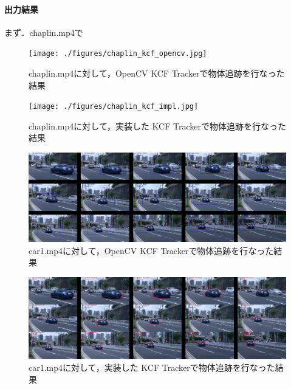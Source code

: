 \documentclass[11pt,a4j]{jarticle}
\begin{document}
    \paragraph{出力結果}
    まず．chaplin.mp4で

    \begin{figure}[hbtp]
      \begin{center}
        \texttt{[image: ./figures/chaplin\_kcf\_opencv.jpg]}
        \caption{chaplin.mp4に対して，OpenCV KCF Trackerで物体追跡を行なった結果}
        \label{fig:AC_PetriNet}
      \end{center}
    \end{figure}

    \begin{figure}[hbtp]
      \begin{center}
        \texttt{[image: ./figures/chaplin\_kcf\_impl.jpg]}
        \caption{chaplin.mp4に対して，実装した KCF Trackerで物体追跡を行なった結果}
        \label{fig:AC_PetriNet}
      \end{center}
    \end{figure}

    \begin{figure}[hbtp]
      \begin{center}
        \includegraphics[clip,width=12.5cm]{./figures/car1_kcf_opencv.jpg}
        \caption{car1.mp4に対して，OpenCV KCF Trackerで物体追跡を行なった結果}
        \label{fig:AC_PetriNet}
      \end{center}
    \end{figure}

    \begin{figure}[hbtp]
      \begin{center}
        \includegraphics[clip,width=12.5cm]{./figures/car1_kcf_impl.jpg}
        \caption{car1.mp4に対して，実装した KCF Trackerで物体追跡を行なった結果}
        \label{fig:AC_PetriNet}
      \end{center}
    \end{figure}
\end{document}
